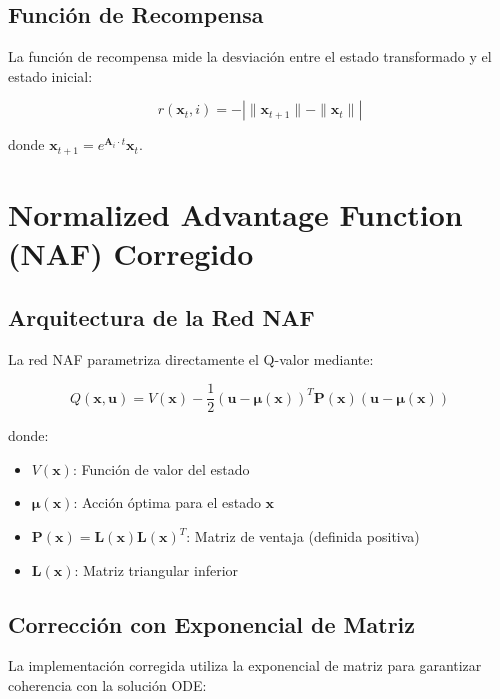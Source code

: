 \documentclass[12pt,a4paper]{article}
\begin{document}
\subsection{Función de Recompensa}

La función de recompensa mide la desviación entre el estado transformado y el estado inicial:

\begin{equation}
r(\mathbf{x}_t, i) = -\left|\|\mathbf{x}_{t+1}\| - \|\mathbf{x}_t\|\right|
\end{equation}

donde $\mathbf{x}_{t+1} = e^{\mathbf{A}_i \cdot t} \mathbf{x}_t$.

\section{Normalized Advantage Function (NAF) Corregido}

\subsection{Arquitectura de la Red NAF}

La red NAF parametriza directamente el Q-valor mediante:

\begin{equation}
Q(\mathbf{x}, \mathbf{u}) = V(\mathbf{x}) - \frac{1}{2}(\mathbf{u} - \boldsymbol{\mu}(\mathbf{x}))^T \mathbf{P}(\mathbf{x}) (\mathbf{u} - \boldsymbol{\mu}(\mathbf{x}))
\end{equation}

donde:
\begin{itemize}
\item $V(\mathbf{x})$: Función de valor del estado
\item $\boldsymbol{\mu}(\mathbf{x})$: Acción óptima para el estado $\mathbf{x}$
\item $\mathbf{P}(\mathbf{x}) = \mathbf{L}(\mathbf{x})\mathbf{L}(\mathbf{x})^T$: Matriz de ventaja (definida positiva)
\item $\mathbf{L}(\mathbf{x})$: Matriz triangular inferior
\end{itemize}

\subsection{Corrección con Exponencial de Matriz}

La implementación corregida utiliza la exponencial de matriz para garantizar coherencia con la solución ODE:
\end{document}
